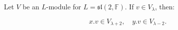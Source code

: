 Let $V$ be an $L$-module for $L = \mathfrak{sl}(2, \mathbb{F})$. If $v \in V_\lambda$, then:

$$x.v \in V_{\lambda+2}, \quad y.v \in V_{\lambda-2}.$$
